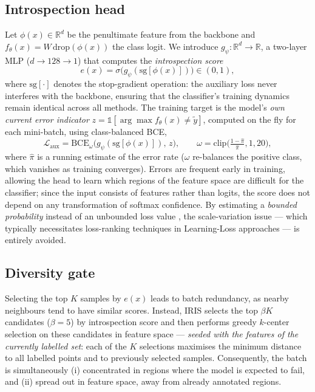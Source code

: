 \documentclass[a4paper,fleqn,longmktitle]{cas-sc}
\newcommand{\method}{IRIS}
\begin{document}
\subsection{Introspection head}\label{sec:head}
Let $\phi(x)\in\mathbb{R}^d$ be the penultimate feature from the
backbone and $f_\theta(x)=W\,\mathrm{drop}(\phi(x))$ the class logit.
We introduce $g_\psi:\mathbb{R}^d\to\mathbb{R}$, a two-layer MLP
($d\to128\to1$) that computes the \emph{introspection score}
\begin{equation}
  e(x)=\sigma\!\big(g_\psi(\mathrm{sg}[\phi(x)])\big)\in(0,1),
\end{equation}
where $\mathrm{sg}[\cdot]$ denotes the stop-gradient operation: the
auxiliary loss never interferes with the backbone, ensuring that the
classifier's training dynamics remain identical across all methods. The
training target is the model's \emph{own current error indicator}
$z=\mathbb{1}[\arg\max f_\theta(x)\neq\tilde{y}]$, computed on the fly
for each mini-batch, using class-balanced BCE,
\begin{equation}
  \mathcal{L}_{\mathrm{aux}}
  =\mathrm{BCE}_{\omega}\big(g_\psi(\mathrm{sg}[\phi(x)]),\,z\big),\qquad
  \omega=\mathrm{clip}\!\Big(\tfrac{1-\hat{\pi}}{\hat{\pi}},1,20\Big),
\end{equation}
where $\hat{\pi}$ is a running estimate of the error rate ($\omega$
re-balances the positive class, which vanishes as training converges).
Errors are frequent early in training, allowing the head to learn which
regions of the feature space are difficult for the classifier; since
the input consists of features rather than logits, the score does not
depend on any transformation of softmax confidence. By estimating a
\emph{bounded probability} instead of an unbounded loss value
\citep{yoo2019}, the scale-variation issue --- which typically
necessitates loss-ranking techniques in Learning-Loss approaches --- is
entirely avoided.

\subsection{Diversity gate}\label{sec:gate}
Selecting the top $K$ samples by $e(x)$ leads to batch redundancy, as
nearby neighbours tend to have similar scores. Instead, \method{}
selects the top $\beta K$ candidates ($\beta=5$) by introspection score
and then performs greedy $k$-center selection \citep{sener2018} on
these candidates in feature space --- \emph{seeded with the features of
the currently labelled set}: each of the $K$ selections maximises the
minimum distance to all labelled points and to previously selected
samples. Consequently, the batch is simultaneously (i) concentrated in
regions where the model is expected to fail, and (ii) spread out in
feature space, away from already annotated regions.
\end{document}
